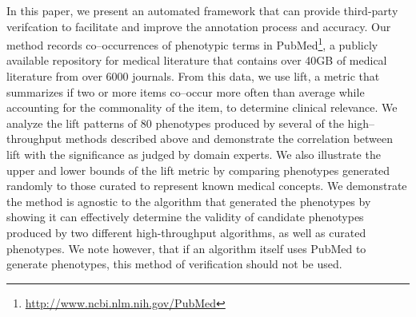 \documentclass{sig-alternate-05-2015}
\begin{document}
In this paper, we present an automated framework that can provide third-party verifcation to facilitate and improve the annotation process and accuracy.
Our method records co--occurrences of phenotypic terms in PubMed\footnote{\url{http://www.ncbi.nlm.nih.gov/PubMed}}, a publicly available repository for medical literature that contains over 40GB of medical literature from over 6000 journals. 
From this data, we use lift, a metric that summarizes if two or more items co--occur more often than average while accounting for the commonality of the item, to determine clinical relevance.
We analyze the lift patterns of 80 phenotypes produced by several of the high--throughput methods described above and demonstrate the correlation between lift with the significance as judged by domain experts.
We also illustrate the upper and lower bounds of the lift metric by comparing phenotypes generated randomly to those curated to represent known medical concepts.
We demonstrate the method is agnostic to the algorithm that generated the phenotypes by showing it can effectively determine the validity of candidate phenotypes produced by two different high-throughput algorithms, as well as curated phenotypes. We note however, that if an algorithm itself uses PubMed to generate phenotypes, this method of verification should not be used.
\end{document}
